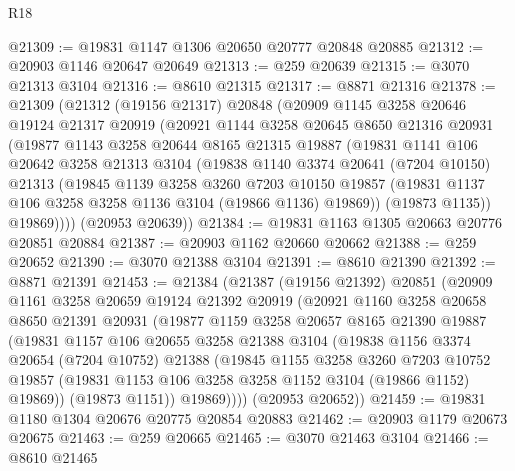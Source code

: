 \begin{lexlean}{R18}
\begin{coremodule}
@21309 := @19831 @1147 @1306 @20650 @20777 @20848 @20885
@21312 := @20903 @1146 @20647 @20649
@21313 := @259 @20639
@21315 := @3070 @21313 @3104
@21316 := @8610 @21315
@21317 := @8871 @21316
@21378 := @21309
    (@21312
      (@19156 @21317)
      @20848
      (@20909
        @1145
        @3258
        @20646
        @19124
        @21317
        @20919
        (@20921
          @1144
          @3258
          @20645
          @8650
          @21316
          @20931
          (@19877
            @1143
            @3258
            @20644
            @8165
            @21315
            @19887
            (@19831
              @1141
              @106
              @20642
              @3258
              @21313
              @3104
              (@19838
                @1140
                @3374
                @20641
                (@7204 @10150)
                @21313
                (@19845
                  @1139
                  @3258
                  @3260
                  @7203
                  @10150
                  @19857
                  (@19831 @1137 @106 @3258 @3258 @1136 @3104 (@19866 @1136) @19869))
                (@19873 @1135))
              @19869))))
      (@20953 @20639))
@21384 := @19831 @1163 @1305 @20663 @20776 @20851 @20884
@21387 := @20903 @1162 @20660 @20662
@21388 := @259 @20652
@21390 := @3070 @21388 @3104
@21391 := @8610 @21390
@21392 := @8871 @21391
@21453 := @21384
    (@21387
      (@19156 @21392)
      @20851
      (@20909
        @1161
        @3258
        @20659
        @19124
        @21392
        @20919
        (@20921
          @1160
          @3258
          @20658
          @8650
          @21391
          @20931
          (@19877
            @1159
            @3258
            @20657
            @8165
            @21390
            @19887
            (@19831
              @1157
              @106
              @20655
              @3258
              @21388
              @3104
              (@19838
                @1156
                @3374
                @20654
                (@7204 @10752)
                @21388
                (@19845
                  @1155
                  @3258
                  @3260
                  @7203
                  @10752
                  @19857
                  (@19831 @1153 @106 @3258 @3258 @1152 @3104 (@19866 @1152) @19869))
                (@19873 @1151))
              @19869))))
      (@20953 @20652))
@21459 := @19831 @1180 @1304 @20676 @20775 @20854 @20883
@21462 := @20903 @1179 @20673 @20675
@21463 := @259 @20665
@21465 := @3070 @21463 @3104
@21466 := @8610 @21465

\end{coremodule}
\end{lexlean}
